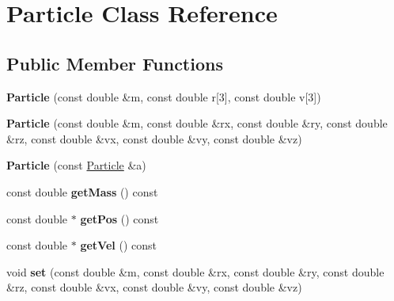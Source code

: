 \hypertarget{classParticle}{
\section{Particle Class Reference}
\label{classParticle}
}
\subsection*{Public Member Functions}
\begin{DoxyCompactItemize}
\item 
\hypertarget{classParticle_a9308c651456cad26c43faa9912cea648}{
{\bfseries Particle} (const double \&m, const double r\mbox{[}3\mbox{]}, const double v\mbox{[}3\mbox{]})}
\label{classParticle_a9308c651456cad26c43faa9912cea648}

\item 
\hypertarget{classParticle_a1907f6764d2bdaf426c4b52e87860f5d}{
{\bfseries Particle} (const double \&m, const double \&rx, const double \&ry, const double \&rz, const double \&vx, const double \&vy, const double \&vz)}
\label{classParticle_a1907f6764d2bdaf426c4b52e87860f5d}

\item 
\hypertarget{classParticle_a602b45f0258d4e61d9c07f2c91d4f497}{
{\bfseries Particle} (const \hyperlink{classParticle}{Particle} \&a)}
\label{classParticle_a602b45f0258d4e61d9c07f2c91d4f497}

\item 
\hypertarget{classParticle_ad55c2cb0a6e50a48de72d6c324b00d44}{
const double {\bfseries getMass} () const }
\label{classParticle_ad55c2cb0a6e50a48de72d6c324b00d44}

\item 
\hypertarget{classParticle_abe0e7a4726615f08d4f5119c6f0fd6aa}{
const double $\ast$ {\bfseries getPos} () const }
\label{classParticle_abe0e7a4726615f08d4f5119c6f0fd6aa}

\item 
\hypertarget{classParticle_af4fc2ad393343867b02534d4a75659f0}{
const double $\ast$ {\bfseries getVel} () const }
\label{classParticle_af4fc2ad393343867b02534d4a75659f0}

\item 
\hypertarget{classParticle_a1a2bc63b8b0ebbb9176c32ac2bbb8597}{
void {\bfseries set} (const double \&m, const double \&rx, const double \&ry, const double \&rz, const double \&vx, const double \&vy, const double \&vz)}
\label{classParticle_a1a2bc63b8b0ebbb9176c32ac2bbb8597}


\end{DoxyCompactItemize}
